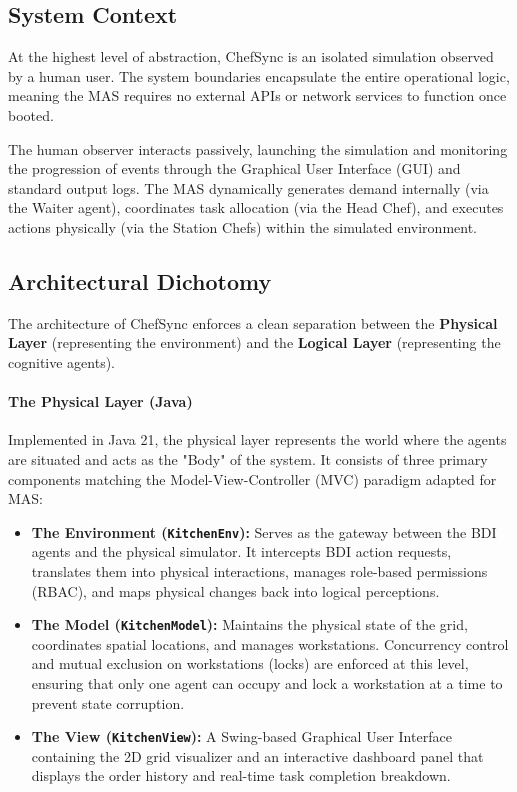 \documentclass{scrartcl}
\begin{document}
\subsection{System Context}

At the highest level of abstraction, ChefSync is an isolated simulation observed by a human user. The system boundaries encapsulate the entire operational logic, meaning the MAS requires no external APIs or network services to function once booted.

The human observer interacts passively, launching the simulation and monitoring the progression of events through the Graphical User Interface (GUI) and standard output logs. The MAS dynamically generates demand internally (via the Waiter agent), coordinates task allocation (via the Head Chef), and executes actions physically (via the Station Chefs) within the simulated environment.

\subsection{Architectural Dichotomy}

The architecture of ChefSync enforces a clean separation between the \textbf{Physical Layer} (representing the environment) and the \textbf{Logical Layer} (representing the cognitive agents).

\paragraph{The Physical Layer (Java)}
Implemented in Java 21, the physical layer represents the world where the agents are situated and acts as the "Body" of the system. It consists of three primary components matching the Model-View-Controller (MVC) paradigm adapted for MAS:
\begin{itemize}
\item \textbf{The Environment (\texttt{KitchenEnv}):} Serves as the gateway between the BDI agents and the physical simulator. It intercepts BDI action requests, translates them into physical interactions, manages role-based permissions (RBAC), and maps physical changes back into logical perceptions.
\item \textbf{The Model (\texttt{KitchenModel}):} Maintains the physical state of the grid, coordinates spatial locations, and manages workstations. Concurrency control and mutual exclusion on workstations (locks) are enforced at this level, ensuring that only one agent can occupy and lock a workstation at a time to prevent state corruption.
\item \textbf{The View (\texttt{KitchenView}):} A Swing-based Graphical User Interface containing the 2D grid visualizer and an interactive dashboard panel that displays the order history and real-time task completion breakdown.
\end{itemize}
\end{document}

